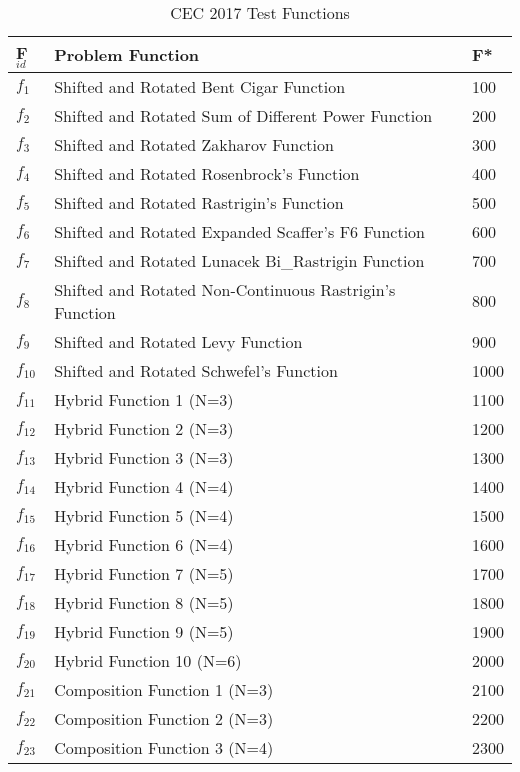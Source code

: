 \begin{table}[!htbp]
\caption{CEC 2017 Test Functions}
\centering
\begin{tabular}{|p{0.5cm}|p{5.4cm}|p{0.6cm}|}
\hline
F$_{id}$ & Problem Function & F* \\ \hline
$f_{1}$ & Shifted and Rotated Bent Cigar Function & 100 \\
\hline
$f_{2}$ & Shifted and Rotated Sum of Different Power Function & 200 \\
\hline
$f_{3}$ & Shifted and Rotated Zakharov Function & 300\\
\hline
$f_{4}$ & Shifted and Rotated Rosenbrock's Function & 400\\
\hline
$f_{5}$ & Shifted and Rotated Rastrigin's Function & 500\\
\hline
$f_{6}$ & Shifted and Rotated Expanded Scaffer's F6 Function & 600\\
\hline
$f_{7}$ & Shifted and Rotated Lunacek Bi\_Rastrigin Function & 700\\
\hline
$f_{8}$ & Shifted and Rotated Non-Continuous Rastrigin's Function & 800\\
\hline
$f_{9}$ & Shifted and Rotated Levy Function & 900\\
\hline
$f_{10}$ & Shifted and Rotated Schwefel's Function & 1000\\
\hline
$f_{11}$ & Hybrid Function 1 (N=3) & 1100\\
\hline
$f_{12}$ & Hybrid Function 2 (N=3) & 1200\\
\hline
$f_{13}$ & Hybrid Function 3 (N=3) & 1300\\
\hline
$f_{14}$ & Hybrid Function 4 (N=4) & 1400\\
\hline
$f_{15}$ & Hybrid Function 5 (N=4) & 1500\\
\hline
$f_{16}$ & Hybrid Function 6 (N=4) & 1600\\
\hline
$f_{17}$ & Hybrid Function 7 (N=5) & 1700\\
\hline
$f_{18}$ & Hybrid Function 8 (N=5) & 1800\\
\hline
$f_{19}$ & Hybrid Function 9 (N=5) & 1900\\
\hline
$f_{20}$ & Hybrid Function 10 (N=6) & 2000\\
\hline
$f_{21}$ & Composition Function 1 (N=3) & 2100\\
\hline
$f_{22}$ & Composition Function 2 (N=3) & 2200\\
\hline
$f_{23}$ & Composition Function 3 (N=4) & 2300\\
\hline

\end{tabular}
\end{table}
